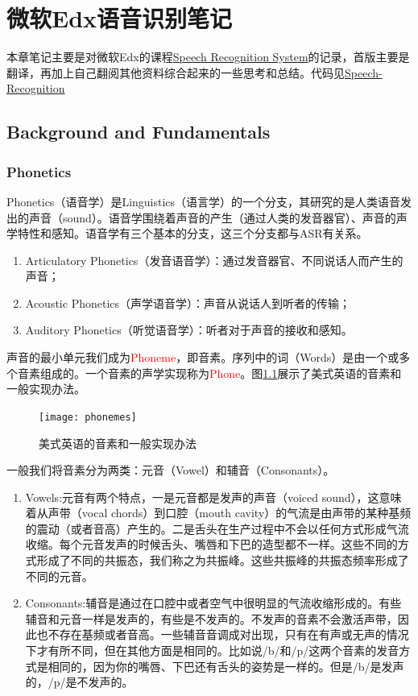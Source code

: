 \chapter{微软Edx语音识别笔记}
本章笔记主要是对微软Edx的课程\href{https://courses.edx.org/courses/course-v1:Microsoft+DEV287x+1T2019a/course/}{Speech Recognition System}的记录，首版主要是翻译，再加上自己翻阅其他资料综合起来的一些思考和总结。代码见\href{https://github.com/MicrosoftLearning/Speech-Recognition}{Speech-Recognition}

\section{Background and Fundamentals}
\subsection{Phonetics} %
\label{ssub:phonetics}
Phonetics（语音学）是Linguistics（语言学）的一个分支，其研究的是人类语音发出的声音（sound）。语音学围绕着声音的产生（通过人类的发音器官）、声音的声学特性和感知。语音学有三个基本的分支，这三个分支都与ASR有关系。
\begin{enumerate}
	\item Articulatory Phonetics（发音语音学）：通过发音器官、不同说话人而产生的声音；
	\item Acoustic Phonetics（声学语音学）：声音从说话人到听者的传输；
	\item Auditory Phonetics（听觉语音学）：听者对于声音的接收和感知。
\end{enumerate}

声音的最小单元我们成为\textcolor{red}{Phoneme}，即音素。序列中的词（Words）是由一个或多个音素组成的。一个音素的声学实现称为\textcolor{red}{Phone}。图\ref{fig:exam-phonemes}展示了美式英语的音素和一般实现办法。
\begin{figure}[htbp]
	\centering
	\texttt{[image: phonemes]}
	\caption{美式英语的音素和一般实现办法 \label{fig:exam-phonemes}}
\end{figure}

一般我们将音素分为两类：元音（Vowel）和辅音（Consonants）。
\begin{enumerate}
	\item Vowels:元音有两个特点，一是元音都是发声的声音（voiced sound），这意味着从声带（vocal chords）到口腔（mouth cavity）的气流是由声带的某种基频的震动（或者音高）产生的。二是舌头在生产过程中不会以任何方式形成气流收缩。每个元音发声的时候舌头、嘴唇和下巴的造型都不一样。这些不同的方式形成了不同的共振态，我们称之为共振峰。这些共振峰的共振态频率形成了不同的元音。
	\item Consonants:辅音是通过在口腔中或者空气中很明显的气流收缩形成的。有些辅音和元音一样是发声的，有些是不发声的。不发声的音素不会激活声带，因此也不存在基频或者音高。一些辅音音调成对出现，只有在有声或无声的情况下才有所不同，但在其他方面是相同的。比如说/b/和/p/这两个音素的发音方式是相同的，因为你的嘴唇、下巴还有舌头的姿势是一样的。但是/b/是发声的，/p/是不发声的。
\end{enumerate}

